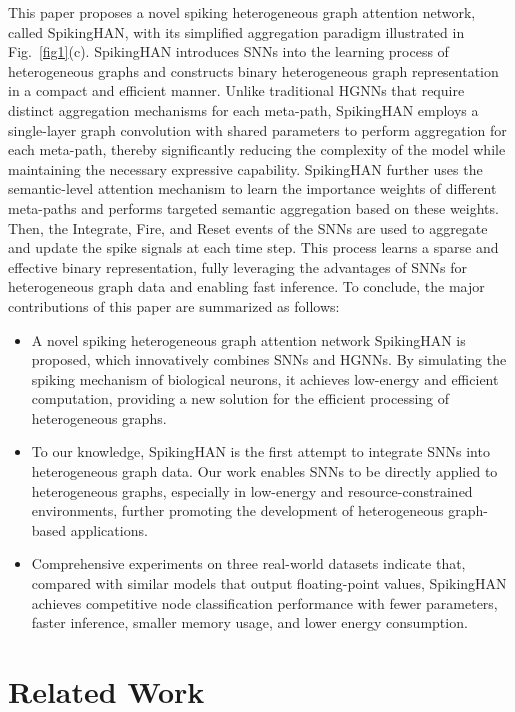 \documentclass[letterpaper]{article} %
\begin{document}
This paper proposes a novel spiking heterogeneous graph attention network, called SpikingHAN, with its simplified aggregation paradigm illustrated in Fig.~\ref{fig1}(c). SpikingHAN introduces SNNs into the learning process of heterogeneous graphs and constructs binary heterogeneous graph representation in a compact and efficient manner. Unlike traditional HGNNs that require distinct aggregation mechanisms for each meta-path, SpikingHAN employs a single-layer graph convolution with shared parameters to perform aggregation for each meta-path, thereby significantly reducing the complexity of the model while maintaining the necessary expressive capability. SpikingHAN further uses the semantic-level attention mechanism to learn the importance weights of different meta-paths and performs targeted semantic aggregation based on these weights. Then, the Integrate, Fire, and Reset events of the SNNs are used to aggregate and update the spike signals at each time step. This process learns a sparse and effective binary representation, fully leveraging the advantages of SNNs for heterogeneous graph data and enabling fast inference. To conclude, the major contributions of this paper are summarized as follows:
\begin{itemize}
    \item A novel spiking heterogeneous graph attention network SpikingHAN is proposed, which innovatively combines SNNs and HGNNs. By simulating the spiking mechanism of biological neurons, it achieves low-energy and efficient computation, providing a new solution for the efficient processing of heterogeneous graphs.
    \item To our knowledge, SpikingHAN is the first attempt to integrate SNNs into heterogeneous graph data. Our work enables SNNs to be directly applied to heterogeneous graphs, especially in low-energy and resource-constrained environments, further promoting the development of heterogeneous graph-based applications.
    \item Comprehensive experiments on three real-world datasets indicate that, compared with similar models that output floating-point values, SpikingHAN achieves competitive node classification performance with fewer parameters, faster inference, smaller memory usage, and lower energy consumption.
\end{itemize}

\section{Related Work}
\end{document}
